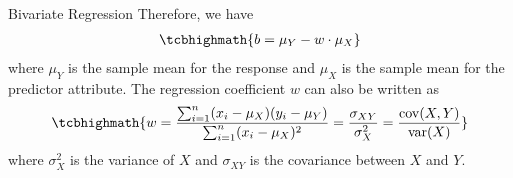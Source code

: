\begin{frame}{Bivariate Regression}
Therefore, we have
\begin{align}
    \tcbhighmath{
    b = \mu_Y - w \cdot \mu_X}
    \label{eq:reg:linear:b}
\end{align}
where $\mu_Y$ is the sample mean for the response and $\mu_X$ is the
sample mean for the predictor attribute.
%
The regression coefficient $w$ can also be written as
\begin{align}
    \tcbhighmath{
    w = \frac{\sum_{i=1}^n (x_i - \mu_X)(y_i - \mu_Y)}{\sum_{i=1}^n (x_i
    - \mu_X)^2} = \frac{\sigma_{XY}}{\sigma_X^2} =
\frac{\ocov(X,Y)}{\var(X)}}
\end{align}
where $\sigma_X^2$ is the variance of $X$ and $\sigma_{XY}$ is the
covariance between $X$ and $Y$.
\end{frame}
%
%
